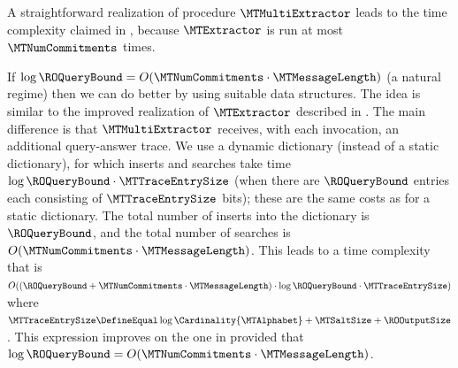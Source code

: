\begin{remark}
\label{remark:mt-multi-extractor-efficient-implementation}
A straightforward realization of procedure $\MTMultiExtractor$ leads to the time complexity claimed in , because $\MTExtractor$ is run at most $\MTNumCommitments$ times.

If $\log \ROQueryBound = O(\MTNumCommitments \cdot \MTMessageLength)$ (a natural regime) then we can do better by using suitable data structures. The idea is similar to the improved realization of $\MTExtractor$ described in . The main difference is that $\MTMultiExtractor$ receives, with each invocation, an additional query-answer trace. We use a dynamic dictionary (instead of a static dictionary), for which inserts and searches take time $\log \ROQueryBound \cdot \MTTraceEntrySize$ (when there are $\ROQueryBound$ entries each consisting of $\MTTraceEntrySize$ bits); these are the same costs as for a static dictionary. The total number of inserts into the dictionary is $\ROQueryBound$, and the total number of searches is $O(\MTNumCommitments \cdot \MTMessageLength)$. This leads to a time complexity that is $O((\ROQueryBound + \MTNumCommitments \cdot \MTMessageLength) \cdot \log \ROQueryBound \cdot \MTTraceEntrySize)$ where $\MTTraceEntrySize \DefineEqual \log\Cardinality{\MTAlphabet} + \MTSaltSize + \ROOutputSize$. This expression improves on the one in  provided that $\log \ROQueryBound = O(\MTNumCommitments \cdot \MTMessageLength)$.
\end{remark}

